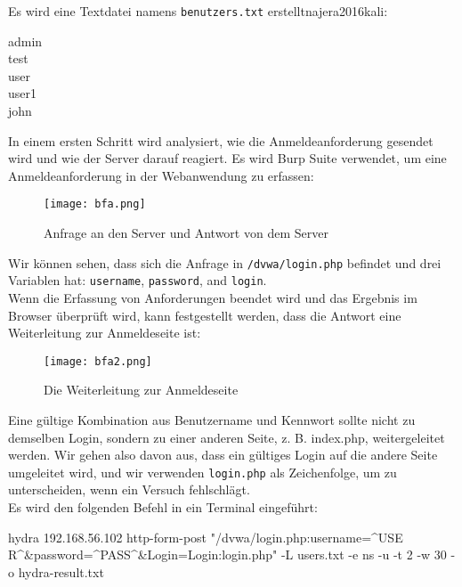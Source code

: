 Es wird eine Textdatei namens \texttt{benutzers.txt} erstellt{najera2016kali}:

\begin{center}
	admin\\test\\user\\user1\\john
\end{center}

In einem ersten Schritt wird analysiert, wie die Anmeldeanforderung gesendet wird und wie der Server darauf reagiert. Es wird Burp Suite verwendet, um eine Anmeldeanforderung in der Webanwendung zu erfassen\cite[144]{najera2016kali}:

\newpage

\begin{figure}[h]
	\centering
	\texttt{[image: bfa.png]}
	\caption{Anfrage an den Server und Antwort von dem Server}
\end{figure}

Wir können sehen, dass sich die Anfrage in \texttt{/dvwa/login.php} befindet und drei Variablen hat: \texttt{username}, \texttt{password}, and \texttt{login}.\\

Wenn die Erfassung von Anforderungen beendet wird und das Ergebnis im Browser überprüft wird, kann festgestellt werden, dass die Antwort eine Weiterleitung zur Anmeldeseite ist\cite[144]{najera2016kali}:

\begin{figure}[h]
	\centering
	\texttt{[image: bfa2.png]}
	\caption{Die Weiterleitung zur Anmeldeseite}
\end{figure}

Eine gültige Kombination aus Benutzername und Kennwort sollte nicht zu demselben Login, sondern zu einer anderen Seite, z. B. index.php, weitergeleitet werden. Wir gehen also davon aus, dass ein gültiges Login auf die andere Seite umgeleitet wird, und wir verwenden \texttt{login.php} als Zeichenfolge, um zu unterscheiden, wenn ein Versuch fehlschlägt\cite[145]{najera2016kali}.\\

Es wird den folgenden Befehl in ein Terminal eingeführt\cite[145]{najera2016kali}:

\begin{LaTeXCode}[caption={Befehl durch Terminal},captionpos=b, label=LaTeXCode:beheldt1][numbers=none]
hydra 192.168.56.102 http-form-post "/dvwa/login.php:username=^USE
R^&password=^PASS^&Login=Login:login.php" -L users.txt -e ns -u -t 2 -w 30 -o hydra-result.txt
\end{LaTeXCode}

